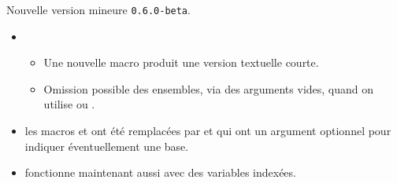 Nouvelle version mineure \verb+0.6.0-beta+.

\begin{itemize}[itemsep=.5em]
    \item {}
    \begin{itemize}[itemsep=.5em]
        \item Une nouvelle macro  produit une version textuelle courte.

        \item Omission possible des ensembles, via des arguments vides, quand on utilise  ou .
    \end{itemize}


    \item {}
          les macros  et  ont été remplacées par  et  qui ont un argument optionnel pour indiquer éventuellement une base.


    \item {}
           fonctionne maintenant aussi avec des variables indexées.
          
\end{itemize}

\separation